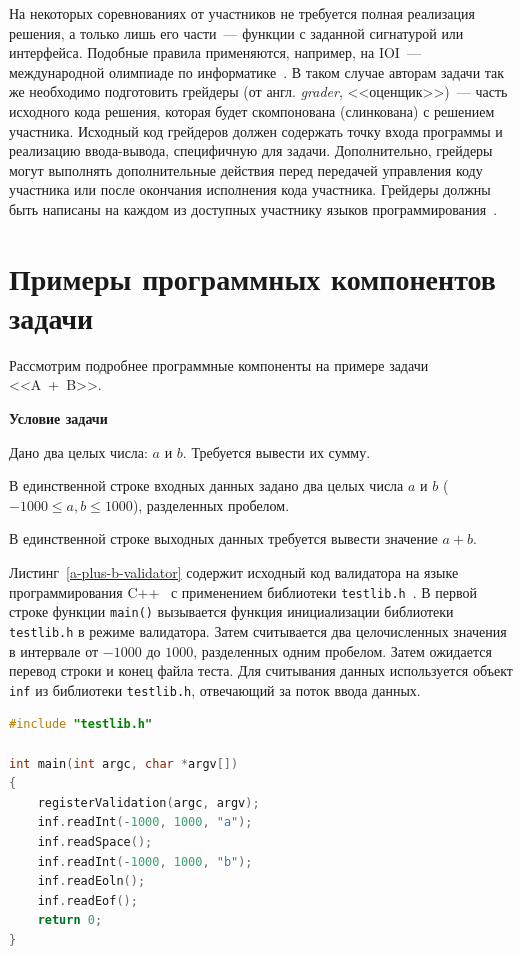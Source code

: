 \documentclass[times,specification,annotation]{style/itmo-student-thesis/itmo-student-thesis}
\begin{document}
На некоторых соревнованиях от участников не требуется полная реализация решения, а только лишь его части~--- функции с заданной сигнатурой или интерфейса. Подобные правила применяются, например, на IOI~--- международной олимпиаде по информатике~\cite{ioi-rules}. В таком случае авторам задачи так же необходимо подготовить грейдеры (от англ. \textit{grader}, <<оценщик>>)~--- часть исходного кода решения, которая будет скомпонована (слинкована) с решением участника. Исходный код грейдеров должен содержать точку входа программы и реализацию ввода-вывода, специфичную для задачи. Дополнительно, грейдеры могут выполнять дополнительные действия перед передачей управления коду участника или после окончания исполнения кода участника. Грейдеры должны быть написаны на каждом из доступных участнику языков программирования~\cite{cf-graders}.

\section{Примеры программных компонентов задачи}

Рассмотрим подробнее программные компоненты на примере задачи <<A~+~B>>. \newline

\vspace*{0.5em}

\textbf{Условие задачи}

Дано два целых числа: $a$ и $b$. Требуется вывести их сумму.

В единственной строке входных данных задано два целых числа $a$ и $b$ ($-1000 \le a, b \le 1000$), разделенных пробелом.

В единственной строке выходных данных требуется вывести значение $a + b$.

\vspace*{2em}

Листинг~\ref{a-plus-b-validator} содержит исходный код валидатора на языке программирования C++~\cite{cppbook} с применением библиотеки \texttt{testlib.h}~\cite{cf-testlib}. В первой строке функции \texttt{main()} вызывается функция инициализации библиотеки \texttt{testlib.h} в режиме валидатора. Затем считывается два целочисленных значения в интервале от $-1000$ до $1000$, разделенных одним пробелом. Затем ожидается перевод строки и конец файла теста. Для считывания данных используется объект \texttt{inf} из библиотеки \texttt{testlib.h}, отвечающий за поток ввода данных.

\begin{lstlisting}[float=!h,caption={Пример валидатора},label={a-plus-b-validator},language=c++]
#include "testlib.h"

int main(int argc, char *argv[])
{
    registerValidation(argc, argv);
    inf.readInt(-1000, 1000, "a");
    inf.readSpace();
    inf.readInt(-1000, 1000, "b");
    inf.readEoln();
    inf.readEof();
    return 0;
}
\end{lstlisting}
\end{document}
